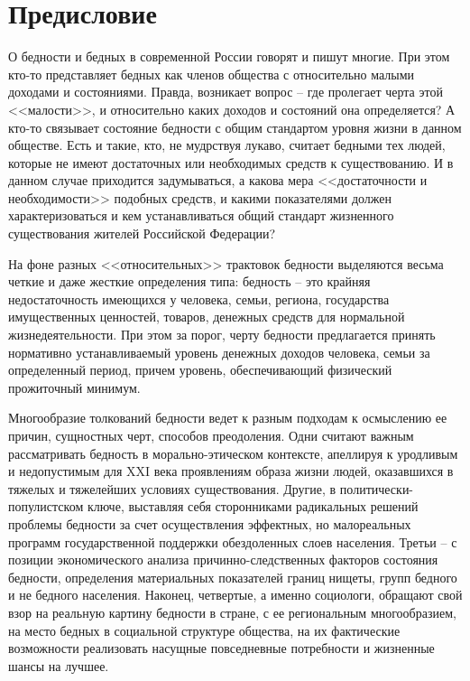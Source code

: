 \chapter{Предисловие}
О бедности и бедных в современной России говорят и пишут многие. При этом 
кто-то представляет бедных как членов общества с относительно малыми доходами 
и состояниями. Правда, возникает вопрос -- где пролегает черта этой 
<<малости>>, и относительно каких доходов и состояний она определяется? А 
кто-то связывает состояние бедности с общим стандартом уровня жизни в данном 
обществе. Есть и такие, кто, не мудрствуя лукаво, считает бедными тех людей, 
которые не имеют достаточных или необходимых средств к существованию. И в 
данном случае приходится задумываться, а какова мера <<достаточности и 
необходимости>> подобных средств, и какими показателями должен 
характеризоваться и кем устанавливаться общий стандарт жизненного 
существования жителей Российской Федерации?

На фоне разных <<относительных>> трактовок бедности выделяются весьма четкие и 
даже жесткие определения типа: бедность -- это крайняя недостаточность 
имеющихся у человека, семьи, региона, государства имущественных ценностей, 
товаров, денежных средств для нормальной жизнедеятельности. При этом за порог, 
черту бедности предлагается принять нормативно устанавливаемый уровень 
денежных доходов человека, семьи за определенный период, причем уровень, 
обеспечивающий физический прожиточный минимум\footnotemark[1].


Многообразие толкований бедности ведет к разным подходам к осмыслению ее 
причин, сущностных черт, способов преодоления. Одни считают важным 
рассматривать бедность в морально-этическом контексте, апеллируя к уродливым 
и недопустимым для XXI века проявлениям образа жизни людей, оказавшихся в 
тяжелых и тяжелейших условиях существования. Другие, в 
политически-популистском ключе, выставляя себя сторонниками радикальных 
решений проблемы бедности за счет осуществления эффектных, но малореальных 
программ государственной поддержки обездоленных слоев населения. Третьи -- с 
позиции экономического анализа причинно-следственных факторов состояния 
бедности, определения материальных показателей границ нищеты, групп бедного и 
не бедного населения. Наконец, четвертые, а именно социологи, обращают свой 
взор на реальную картину бедности в стране, с ее региональным многообразием, 
на место бедных в социальной структуре общества, на их фактические возможности 
реализовать насущные повседневные потребности и жизненные шансы на лучшее.
\cite{vestnik}

